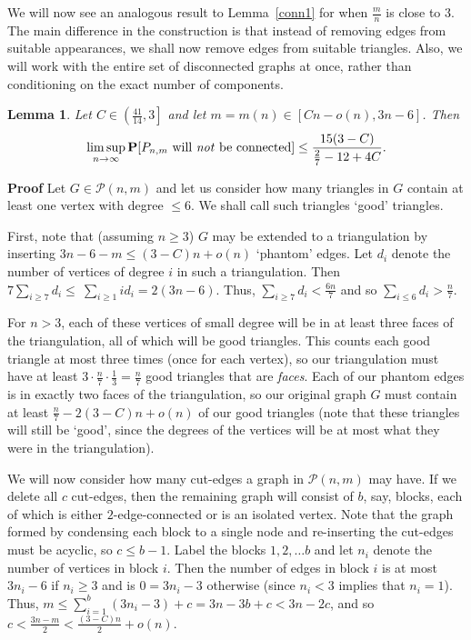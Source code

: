 \documentclass{article}
\newtheorem{Lemma}[Theorem]{Lemma}
\newtheorem{Proof of Theorem}{Proof of Theorem}
\begin{document}
We will now see an analogous result to Lemma~\ref{conn1} for when $\frac{m}{n}$ is close to $3$.
The main difference in the construction is that
instead of removing edges from suitable appearances, 
we shall now remove edges from suitable triangles.
Also,
we will work with the entire set of disconnected graphs at once,
rather than conditioning on the exact number of components.















\begin{Lemma} \label{conn2}
Let $C \in \left( \frac{41}{14},3 \right]$ and let $m=m(n) \in [Cn-o(n), 3n-6]$.
Then
\begin{displaymath}
\limsup _{n \to \infty} \mathbf{P}[P_{n,m} \textrm{ will \emph{not} be connected}] 
\leq \frac{15(3-C)}{\frac{2}{7} - 12 + 4C}.
\end{displaymath}
\end{Lemma}
\textbf{Proof}
Let $G \in \mathcal{P}(n,m)$ and let us consider how many triangles in $G$ contain at least one vertex with degree $\leq 6$.
We shall call such triangles `good' triangles.

First, note that (assuming $n \geq 3$)
$G$ may be extended to a triangulation by inserting $3n-6-m \leq (3-C)n + o(n)$ `phantom' edges.
Let $d_{i}$ denote the number of vertices of degree $i$ in such a triangulation.
Then $7 \sum_{i \geq 7} d_{i} \leq~\sum_{i \geq 1} i d_{i} = 2(3n-6)$.
Thus, $\sum_{i \geq 7} d_{i} < \frac{6n}{7}$ and so $\sum_{i \leq 6} d_{i} > \frac{n}{7}$.

For $n>3$, each of these vertices of small degree will be in at least three faces of the triangulation,
all of which will be good triangles.
This counts each good triangle at most three times
(once for each vertex),
so our triangulation must have at least 
$3 \cdot \frac{n}{7} \cdot \frac{1}{3} = \frac{n}{7}$ good triangles that are \textit{faces}.
Each of our phantom edges is in exactly two faces of the triangulation,
so our original graph $G$ must contain at least $\frac{n}{7} - 2(3-C)n + o(n)$ of our good triangles
(note that these triangles will still be `good', 
since the degrees of the vertices will be at most what they were in the triangulation).

We will now consider how many cut-edges a graph in $\mathcal{P}(n,m)$ may have.
If we delete all $c$ cut-edges,
then the remaining graph will consist of $b$, say, blocks,
each of which is either $2$-edge-connected or is an isolated vertex.
Note that the graph formed by condensing each block to a single node and re-inserting the cut-edges must be acyclic,
so $c \leq b-1$.
Label the blocks $1,2, \ldots b$ and let $n_{i}$ denote the number of vertices in block $i$.
Then the number of edges in block $i$ is at most $3n_{i}-6$ if $n_{i} \geq 3$ and is $0=3n_{i}-3$ otherwise
(since $n_{i} < 3$ implies that $n_{i} = 1$).
Thus, $m \leq \sum_{i=1}^{b} (3n_{i}-3) + c = 3n-3b+c < 3n-2c$,
and so $c < \frac{3n-m}{2} < \frac{(3-C)n}{2} + o(n)$.
\end{document}
